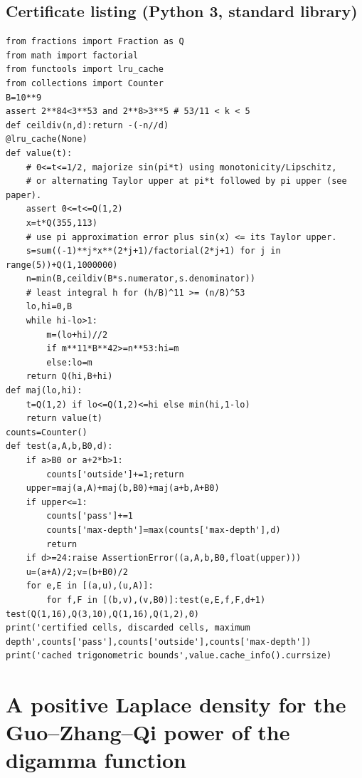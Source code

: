 \documentclass[11pt,a4paper]{article}
\numberwithin{equation}{section}
\theoremstyle{definition}
\theoremstyle{remark}
\begin{document}
\subsection*{Certificate listing (Python 3, standard library)}
\begingroup\scriptsize\begin{Verbatim}
from fractions import Fraction as Q
from math import factorial
from functools import lru_cache
from collections import Counter
B=10**9
assert 2**84<3**53 and 2**8>3**5 # 53/11 < k < 5
def ceildiv(n,d):return -(-n//d)
@lru_cache(None)
def value(t):
    # 0<=t<=1/2, majorize sin(pi*t) using monotonicity/Lipschitz,
    # or alternating Taylor upper at pi*t followed by pi upper (see paper).
    assert 0<=t<=Q(1,2)
    x=t*Q(355,113)
    # use pi approximation error plus sin(x) <= its Taylor upper.
    s=sum((-1)**j*x**(2*j+1)/factorial(2*j+1) for j in range(5))+Q(1,1000000)
    n=min(B,ceildiv(B*s.numerator,s.denominator))
    # least integral h for (h/B)^11 >= (n/B)^53
    lo,hi=0,B
    while hi-lo>1:
        m=(lo+hi)//2
        if m**11*B**42>=n**53:hi=m
        else:lo=m
    return Q(hi,B+hi)
def maj(lo,hi):
    t=Q(1,2) if lo<=Q(1,2)<=hi else min(hi,1-lo)
    return value(t)
counts=Counter()
def test(a,A,b,B0,d):
    if a>B0 or a+2*b>1:
        counts['outside']+=1;return
    upper=maj(a,A)+maj(b,B0)+maj(a+b,A+B0)
    if upper<=1:
        counts['pass']+=1
        counts['max-depth']=max(counts['max-depth'],d)
        return
    if d>=24:raise AssertionError((a,A,b,B0,float(upper)))
    u=(a+A)/2;v=(b+B0)/2
    for e,E in [(a,u),(u,A)]:
        for f,F in [(b,v),(v,B0)]:test(e,E,f,F,d+1)
test(Q(1,16),Q(3,10),Q(1,16),Q(1,2),0)
print('certified cells, discarded cells, maximum depth',counts['pass'],counts['outside'],counts['max-depth'])
print('cached trigonometric bounds',value.cache_info().currsize)
\end{Verbatim}
\endgroup

\par\endgroup

\begingroup
\newcommand{\Lap}{\mathcal L}
\section{\texorpdfstring{A positive Laplace density for the Guo--Zhang--Qi power of the digamma function}{A positive Laplace density for the Guo--Zhang--Qi power of the digamma function}}\label{section:r40heisei}
\par\medskip
\end{document}
